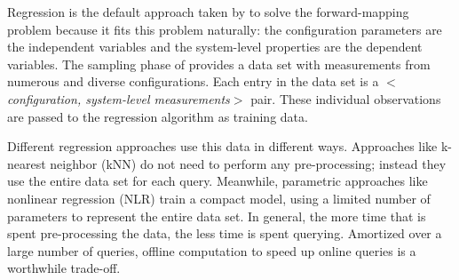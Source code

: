 Regression is the default approach taken by \fw to solve the forward-mapping problem because
it fits this problem naturally: the configuration parameters are the independent variables and the system-level properties are the dependent variables.
The sampling phase of \fw provides a data set with measurements from numerous and diverse configurations.
Each entry in the data set is a \textit{$<$configuration, system-level measurements$>$} pair.
These individual observations are passed to the regression algorithm as training data.

Different regression approaches use this data in different ways.
Approaches like k-nearest neighbor (kNN) do not need to perform any pre-processing; instead they use the entire data set for each query.
Meanwhile, parametric approaches like nonlinear regression (NLR) train a compact model, using a limited number of parameters to represent the entire data set.
In general, the more time that is spent pre-processing the data, the less time is spent querying.
Amortized over a large number of queries, offline computation to speed up online queries is a worthwhile trade-off.



